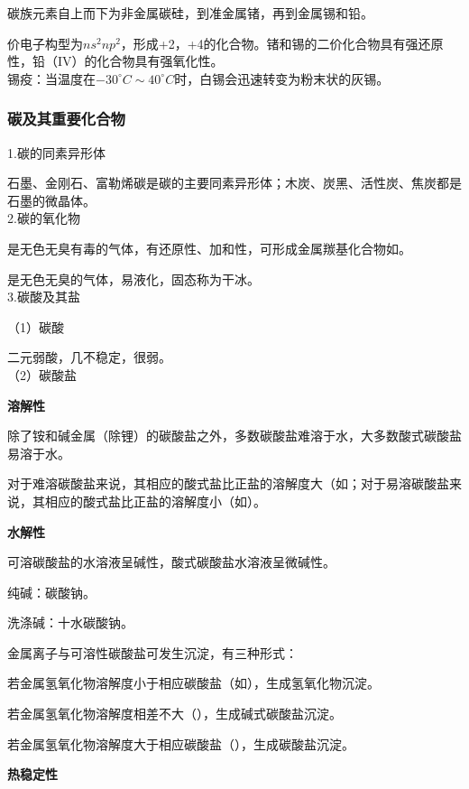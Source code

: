\documentclass[a4paper,UTF8]{article}
\begin{document}
碳族元素自上而下为非金属碳硅，到准金属锗，再到金属锡和铅。

价电子构型为$ns^2np^2$，形成+2，+4的化合物。锗和锡的二价化合物具有强还原性，铅（IV）的化合物具有强氧化性。\\

锡疫：当温度在$ -30^\circ C \sim 40^\circ C $时，白锡会迅速转变为粉末状的灰锡。

\subsubsection{碳及其重要化合物}

1.碳的同素异形体

石墨、金刚石、富勒烯碳是碳的主要同素异形体；木炭、炭黑、活性炭、焦炭都是石墨的微晶体。\\

2.碳的氧化物

是无色无臭有毒的气体，有还原性、加和性，可形成金属羰基化合物如\ce{[Ni(CO)4]}。

是无色无臭的气体，易液化，固态称为干冰。\\

3.碳酸及其盐

（1）碳酸

二元弱酸，几不稳定，很弱。\\

（2）碳酸盐

\textbf{溶解性}

除了铵和碱金属（除锂）的碳酸盐之外，多数碳酸盐难溶于水，大多数酸式碳酸盐易溶于水。

对于难溶碳酸盐来说，其相应的酸式盐比正盐的溶解度大（如；对于易溶碳酸盐来说，其相应的酸式盐比正盐的溶解度小（如）。

\textbf{水解性}

可溶碳酸盐的水溶液呈碱性，酸式碳酸盐水溶液呈微碱性。

纯碱：碳酸钠。

洗涤碱：十水碳酸钠。

金属离子与可溶性碳酸盐可发生沉淀，有三种形式：

若金属氢氧化物溶解度小于相应碳酸盐（如），生成氢氧化物沉淀。

若金属氢氧化物溶解度相差不大（），生成碱式碳酸盐沉淀。

若金属氢氧化物溶解度大于相应碳酸盐（），生成碳酸盐沉淀。

\textbf{热稳定性}
\end{document}
